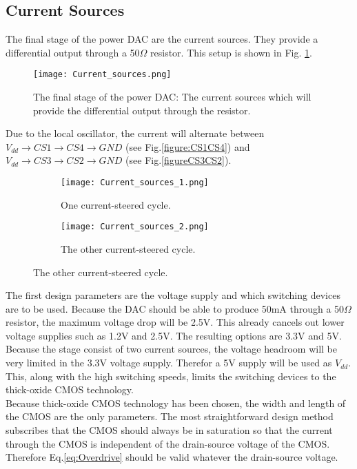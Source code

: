 \subsection{Current Sources}\label{sec:currentsources}
The final stage of the power DAC are the current sources. They provide a differential output through a 50$\Omega$ resistor. This setup is shown in Fig. \ref{figure:Current_sources}.
\begin{figure}
\begin{center}
\texttt{[image: Current\_sources.png]}
\caption{The final stage of the power DAC: The current sources which will provide the differential output through the resistor.}
\label{figure:Current_sources}
\end{center}
\end{figure}
Due to the local oscillator, the current will alternate between $V_{dd} \rightarrow CS1 \rightarrow CS4 \rightarrow GND$ (see Fig.\ref{figure:CS1CS4}) and $V_{dd} \rightarrow CS3 \rightarrow CS2 \rightarrow GND$ (see Fig.\ref{figureCS3CS2}). 
\begin{figure}
\centering
\begin{subfigure}{0.5\textwidth}
\centering
\texttt{[image: Current\_sources\_1.png]}
\caption{One current-steered cycle.}
\label{fig:CS1CS4}
\end{subfigure}
\begin{subfigure}{0.5\textwidth}
\centering
\texttt{[image: Current\_sources\_2.png]}
\caption{The other current-steered cycle.}
\label{fig:CS3CS2}
\end{subfigure}
\end{figure}
The first design parameters are the voltage supply and which switching devices are to be used. Because the DAC should be able to produce 50mA through a 50$\Omega$ resistor, the maximum voltage drop will be 2.5V. This already cancels out lower voltage supplies such as 1.2V and 2.5V. The resulting options are 3.3V and 5V. Because the stage consist of two current sources, the voltage headroom will be very limited in the 3.3V voltage supply. Therefor a 5V supply will be used as $V_{dd}$. This, along with the high switching speeds, limits the switching devices to the thick-oxide CMOS technology.\\
Because thick-oxide CMOS technology has been chosen, the width and length of the CMOS are the only parameters. The most straightforward design method subscribes that the CMOS should always be in saturation so that the current through the CMOS is independent of the drain-source voltage of the CMOS. Therefore Eq.\ref{eq:Overdrive} should be valid whatever the drain-source voltage.
